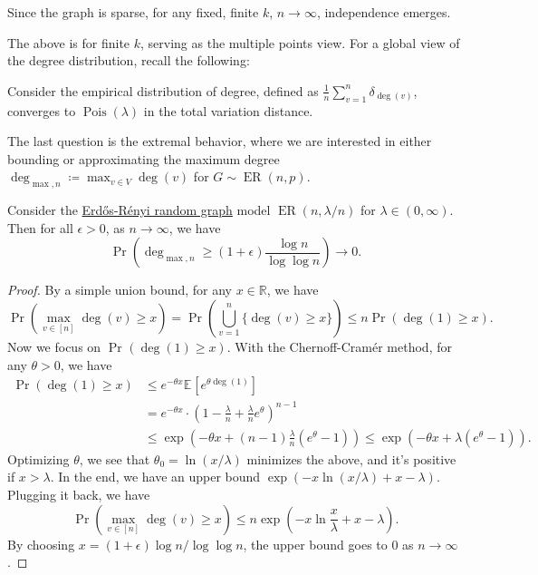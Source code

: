 \begin{intuition}
	Since the graph is sparse, for any fixed, finite \(k\),  \(n \to \infty \), independence emerges.
\end{intuition}

The above is for finite \(k\), serving as the multiple points view. For a global view of the degree distribution, recall the following:

\begin{prev}
	Consider the empirical distribution of degree, defined as \(\frac{1}{n} \sum_{v=1}^{n} \delta _{\deg(v)}\), converges to \(\operatorname{Pois}(\lambda ) \) in the total variation distance.
\end{prev}

The last question is the extremal behavior, where we are interested in either bounding or approximating the maximum degree \(\deg _{\max , n} \coloneqq \max _{v \in V} \deg (v)\) for \(G \sim \operatorname{ER}(n, p)\).

\begin{proposition}\label{prop:Erdős-Rényi-max-degree}
	Consider the \hyperref[def:Erdős-Rényi-random-graph]{Erdős-Rényi random graph} model \(\operatorname{ER}(n, \lambda / n)\) for \(\lambda \in (0, \infty )\). Then for all \(\epsilon > 0\), as \(n \to \infty \), we have
	\[
		\Pr_{}\left( \deg _{\max , n} \geq (1 + \epsilon ) \frac{\log n}{\log \log n} \right)
		\to 0.
	\]
\end{proposition}
\begin{proof}
	By a simple union bound, for any \(x \in \mathbb{R} \), we have
	\[
		\Pr_{}\left( \max _{v \in [n]} \deg (v) \geq x\right)
		= \Pr_{}\left( \bigcup_{v=1}^{n} \{ \deg (v) \geq x \} \right)
		\leq n \Pr_{}(\deg (1) \geq x) .
	\]
	Now we focus on \(\Pr_{}(\deg (1) \geq x) \). With the Chernoff-Cramér method, for any \(\theta > 0\), we have
	\begin{align*}
		\Pr_{}(\deg (1) \geq x)
		 & \leq e^{-\theta x} \mathbb{E}_{}[e^{\theta \deg (1)}]                                             \\
		 & = e^{-\theta x} \cdot \left( 1 - \frac{\lambda}{n} + \frac{\lambda}{n} e^{\theta } \right) ^{n-1} \\
		 & \leq \exp (-\theta x + (n-1) \frac{\lambda}{n} (e^\theta - 1))
		\leq \exp (-\theta x + \lambda (e^\theta - 1)). \tag*{(\(1 + t \leq e^t\))}
	\end{align*}
	Optimizing \(\theta \), we see that \(\theta _0 = \ln (x / \lambda )\) minimizes the above, and it's positive if \(x > \lambda \). In the end, we have an upper bound \(\exp (-x \ln (x / \lambda ) + x - \lambda )\). Plugging it back, we have
	\[
		\Pr_{}\left( \max _{v \in [n]} \deg (v) \geq x\right)
		\leq n \exp (- x \ln \frac{x}{\lambda } + x - \lambda ).
	\]
	By choosing \(x = (1 + \epsilon ) \log n / \log \log n\), the upper bound goes to \(0\) as \(n \to \infty \).
\end{proof}

